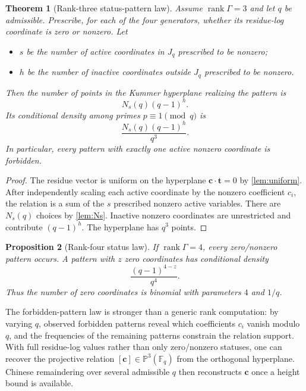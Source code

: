 \documentclass[11pt]{article}
\newtheorem{theorem}{Theorem}[section]
\newtheorem{proposition}[theorem]{Proposition}
\theoremstyle{definition}
\theoremstyle{remark}
\newcommand{\F}{\mathbb{F}}
\newcommand{\rank}{\operatorname{rank}}
\begin{document}
\begin{theorem}[Rank-three status-pattern law]\label{thm:patternlaw}
Assume $\rank\Gamma=3$ and let $q$ be admissible.  Prescribe, for each of the four generators,
whether its residue-log coordinate is zero or nonzero.  Let
\begin{itemize}[leftmargin=2em,itemsep=1pt]
\item $s$ be the number of active coordinates in $J_q$ prescribed to be nonzero;
\item $h$ be the number of inactive coordinates outside $J_q$ prescribed to be nonzero.
\end{itemize}
Then the number of points in the Kummer hyperplane realizing the pattern is
\[
       N_s(q)(q-1)^h.
       \tag{5.2}\label{eq:patterncount}
\]
Its conditional density among primes $p\equiv1\pmod q$ is
\[
       \frac{N_s(q)(q-1)^h}{q^3}.
       \tag{5.3}\label{eq:patterndensity}
\]
In particular, every pattern with exactly one active nonzero coordinate is forbidden.
\end{theorem}
\begin{proof}
The residue vector is uniform on the hyperplane $\bm c\cdot\bm t=0$ by
\cref{lem:uniform}.  After independently scaling each active coordinate by the nonzero
coefficient $c_i$, the relation is a sum of the $s$ prescribed nonzero active variables.  There
are $N_s(q)$ choices by \cref{lem:Ns}.  Inactive nonzero coordinates are unrestricted and
contribute $(q-1)^h$.  The hyperplane has $q^3$ points.
\end{proof}

\begin{proposition}[Rank-four status law]\label{prop:rank4patterns}
If $\rank\Gamma=4$, every zero/nonzero pattern occurs.  A pattern with $z$ zero coordinates
has conditional density
\[
       \frac{(q-1)^{4-z}}{q^4}.
\]
Thus the number of zero coordinates is binomial with parameters $4$ and $1/q$.
\end{proposition}

The forbidden-pattern law is stronger than a generic rank computation: by varying $q$, observed
forbidden patterns reveal which coefficients $c_i$ vanish modulo $q$, and the frequencies of the
remaining patterns constrain the relation support.  With full residue-log values rather than
only zero/nonzero statuses, one can recover the projective relation $[\bm c]\in\mathbb P^3(\F_q)$
from the orthogonal hyperplane.  Chinese remaindering over several admissible $q$ then reconstructs
$\bm c$ once a height bound is available.
\end{document}
